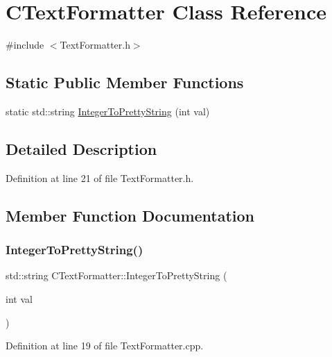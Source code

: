\hypertarget{classCTextFormatter}{}\section{C\+Text\+Formatter Class Reference}
\label{classCTextFormatter}


{\ttfamily \#include $<$Text\+Formatter.\+h$>$}

\subsection*{Static Public Member Functions}
\begin{DoxyCompactItemize}
\item 
static std\+::string \hyperlink{classCTextFormatter_a99cc7219fb635bff88c31f0b906f5db0}{Integer\+To\+Pretty\+String} (int val)
\end{DoxyCompactItemize}


\subsection{Detailed Description}


Definition at line 21 of file Text\+Formatter.\+h.



\subsection{Member Function Documentation}
\hypertarget{classCTextFormatter_a99cc7219fb635bff88c31f0b906f5db0}{}\label{classCTextFormatter_a99cc7219fb635bff88c31f0b906f5db0} 
\subsubsection{\texorpdfstring{Integer\+To\+Pretty\+String()}{IntegerToPrettyString()}}
{\footnotesize\ttfamily std\+::string C\+Text\+Formatter\+::\+Integer\+To\+Pretty\+String (\begin{DoxyParamCaption}\item[{int}]{val }\end{DoxyParamCaption})\hspace{0.3cm}{\ttfamily [static]}}



Definition at line 19 of file Text\+Formatter.\+cpp.


